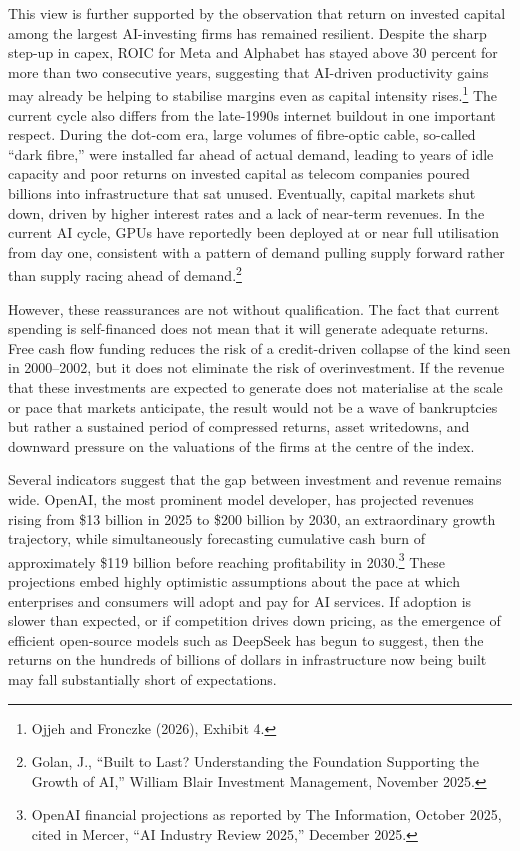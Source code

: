 \documentclass[12pt,a4paper]{article}
\begin{document}
This view is further supported by the observation that return on invested capital among the largest AI-investing firms has remained resilient. Despite the sharp step-up in capex, ROIC for Meta and Alphabet has stayed above 30 percent for more than two consecutive years, suggesting that AI-driven productivity gains may already be helping to stabilise margins even as capital intensity rises.\footnote{Ojjeh and Fronczke (2026), Exhibit 4.} The current cycle also differs from the late-1990s internet buildout in one important respect. During the dot-com era, large volumes of fibre-optic cable, so-called ``dark fibre,'' were installed far ahead of actual demand, leading to years of idle capacity and poor returns on invested capital as telecom companies poured billions into infrastructure that sat unused. Eventually, capital markets shut down, driven by higher interest rates and a lack of near-term revenues. In the current AI cycle, GPUs have reportedly been deployed at or near full utilisation from day one, consistent with a pattern of demand pulling supply forward rather than supply racing ahead of demand.\footnote{Golan, J., ``Built to Last? Understanding the Foundation Supporting the Growth of AI,'' William Blair Investment Management, November 2025.}
 
However, these reassurances are not without qualification. The fact that current spending is self-financed does not mean that it will generate adequate returns. Free cash flow funding reduces the risk of a credit-driven collapse of the kind seen in 2000--2002, but it does not eliminate the risk of overinvestment. If the revenue that these investments are expected to generate does not materialise at the scale or pace that markets anticipate, the result would not be a wave of bankruptcies but rather a sustained period of compressed returns, asset writedowns, and downward pressure on the valuations of the firms at the centre of the index.
 
Several indicators suggest that the gap between investment and revenue remains wide. OpenAI, the most prominent model developer, has projected revenues rising from \$13 billion in 2025 to \$200 billion by 2030, an extraordinary growth trajectory, while simultaneously forecasting cumulative cash burn of approximately \$119 billion before reaching profitability in 2030.\footnote{OpenAI financial projections as reported by The Information, October 2025, cited in Mercer, ``AI Industry Review 2025,'' December 2025.} These projections embed highly optimistic assumptions about the pace at which enterprises and consumers will adopt and pay for AI services. If adoption is slower than expected, or if competition drives down pricing, as the emergence of efficient open-source models such as DeepSeek has begun to suggest, then the returns on the hundreds of billions of dollars in infrastructure now being built may fall substantially short of expectations.
 
\end{document}
